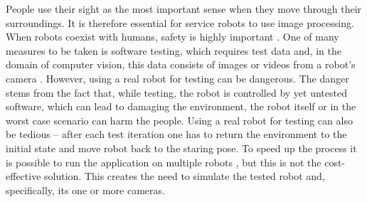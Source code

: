 \documentclass{svproc}
\begin{document}
People use their sight as the most important sense when they move through their surroundings.
It is therefore essential for service robots to use image processing.
When robots coexist with humans, safety is highly important \cite{haddadin2007safety}.
One of many measures to be taken is software testing,
which requires test data and, in the domain of computer vision, this data consists of images or videos from a robot's camera \cite{7759425}.
However, using a real robot for testing can be dangerous.
The danger stems from the fact that, while testing, the robot is controlled by yet untested software, which can lead to damaging the environment, the robot itself or in the worst case scenario can harm the people.
Using a real robot for testing can also be tedious -- after each test iteration one has to return the environment to the initial state and move robot back to the staring pose.
To speed up the process it is possible to run the application on multiple robots \cite{levine2018learning}, but this is not the cost-effective solution.
This creates the need to simulate the tested robot and, specifically, its one or more cameras.
\end{document}
